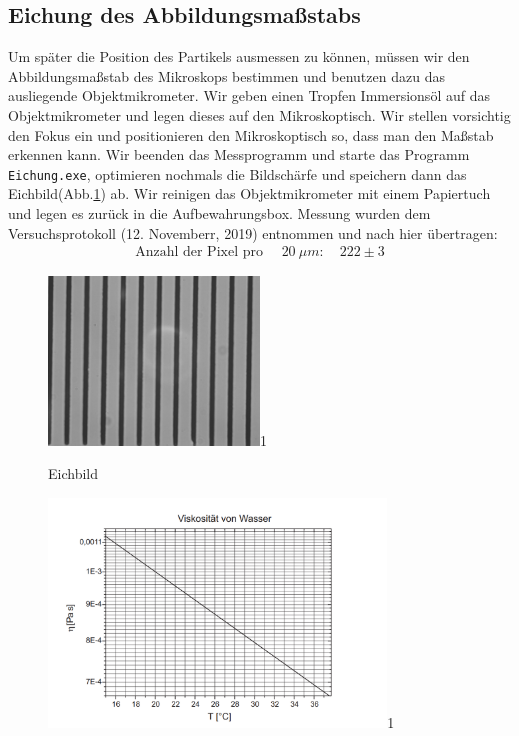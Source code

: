 \documentclass[a4paper,10pt]{article}
\begin{document}
\subsection{Eichung des Abbildungsmaßstabs} 
Um später die Position des Partikels ausmessen zu können, müssen wir den Abbildungsmaßstab des Mikroskops bestimmen und benutzen dazu das ausliegende Objektmikrometer. Wir geben einen Tropfen Immersionsöl auf das Objektmikrometer und legen dieses auf den Mikroskoptisch. Wir stellen vorsichtig den Fokus ein und positionieren den Mikroskoptisch so, dass man den Maßstab erkennen kann. Wir beenden das Messprogramm und starte das Programm \texttt{Eichung.exe}, optimieren nochmals die Bildschärfe und speichern dann das Eichbild(Abb.\ref{fig:eich}) ab. Wir reinigen das Objektmikrometer mit einem Papiertuch und legen es zurück in die Aufbewahrungsbox.
Messung wurden dem Versuchsprotokoll (12. Novemberr, 2019) entnommen und nach hier übertragen:
\begin{align*}
 \text{Anzahl der Pixel pro }\quad{20\:\mu m}: \quad 222\pm 3
\end{align*}
\begin{figure}[htb]
  \centering
  \begin{annotate}{\includegraphics[width=0.5\textwidth]{eich.png}}{1}
  \end{annotate}
\caption{Eichbild}
\label{fig:eich}
\end{figure}

\begin{figure}[htb]
  \centering
  \begin{annotate}{\includegraphics[width=0.8\textwidth]{pic1.png}}{1}
  \end{annotate}
\caption{}
\label{fig:pic1}
\end{figure}
\end{document}
